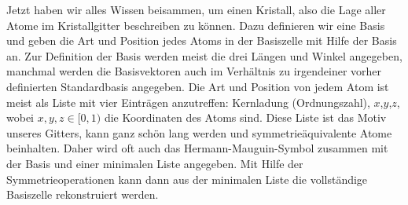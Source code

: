 
Jetzt haben wir alles Wissen beisammen, um einen Kristall, also die Lage aller Atome im Kristallgitter beschreiben zu können. Dazu definieren wir eine Basis und geben die Art und Position jedes Atoms in der Basiszelle mit Hilfe der Basis an. Zur Definition der Basis werden meist die drei Längen und Winkel angegeben, manchmal werden die Basisvektoren auch im Verhältnis zu irgendeiner vorher definierten Standardbasis angegeben. Die Art und Position von jedem Atom ist meist als Liste mit vier Einträgen anzutreffen: Kernladung (Ordnungszahl), $x$,$y$,$z$, wobei $x,y,z \in [0,1)$ die Koordinaten des Atoms sind. Diese Liste ist das Motiv unseres Gitters, kann ganz schön lang werden und symmetrieäquivalente Atome beinhalten. Daher wird oft auch das Hermann-Mauguin-Symbol zusammen mit der Basis und einer minimalen Liste angegeben. Mit Hilfe der Symmetrieoperationen kann dann aus der minimalen Liste die vollständige Basiszelle rekonstruiert werden.